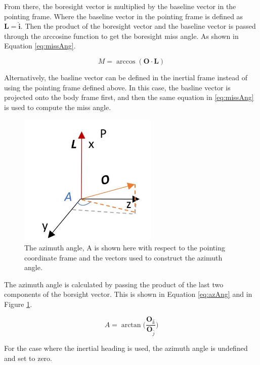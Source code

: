 From there, the boresight vector is multiplied by the baseline vector in the pointing frame. Where the baseline vector in the pointing frame is defined as $\bm L = \hat{\bm i}$. Then the product of the boresight vector and the baseline vector is passed through the arccosine function to get the boresight miss angle. As shown in Equation \ref{eq:missAng}.

 \begin{equation}
 	\label{eq:missAng}
 	M = \arccos(\bm O \cdot \bm L)
\end{equation}

Alternatively, the basline vector can be defined in the inertial frame instead of using the pointing frame defined above. In this case, the basline vector is projected onto the body frame first, and then the same equation in \ref{eq:missAng} is used to compute the miss angle.

\begin{figure}[H]
	\centerline{
		 \includegraphics[height = 2.5in]{Figures/azi.JPG}
	}
	\caption{The azimuth angle, A is shown here with respect to the pointing coordinate frame and the vectors used to construct the azimuth angle.}
	\label{fig:Fig2}
\end{figure}
 
The azimuth angle is calculated by passing the product of the last two components of the borsight vector. This is shown in Equation \ref{eq:azAng} and in Figure \ref{fig:Fig2}.

 \begin{equation}
 	\label{eq:azAng}
 	A = \arctan\bigg(\frac{\bm O_{\hat k}}{\bm O_{\hat j}}\bigg)
\end{equation}

For the case where the inertial heading is used, the azimuth angle is undefined and set to zero.